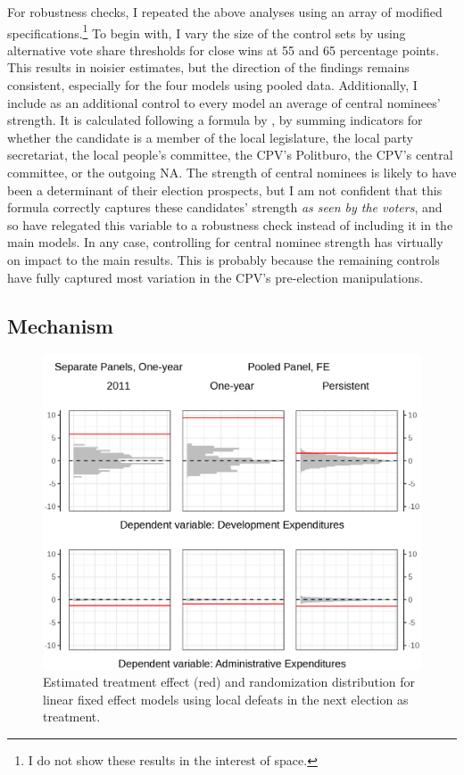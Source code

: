 \documentclass[12pt]{article}\usepackage[]{graphicx}\usepackage[]{color}
\newcommand{\1}{\mathbbm{1}}
\begin{document}
For robustness checks, I repeated the above analyses using an array of modified specifications.\footnote{I do not show these results in the interest of space.} To begin with, I vary the size of the control sets by using alternative vote share thresholds for close wins at 55 and 65 percentage points. This results in noisier estimates, but the direction of the findings remains consistent, especially for the four models using pooled data. Additionally, I include as an additional control to every model an average of central nominees' strength. It is calculated following a formula by \cite{MaleskySchuler2011}, by summing indicators for whether the candidate is a member of the local legislature, the local party secretariat, the local people's committee, the CPV's Politburo, the CPV's central committee, or the outgoing NA. The strength of central nominees is likely to have been a determinant of their election prospects, but I am not confident that this formula correctly captures these candidates' strength \textit{as seen by the voters}, and so have relegated this variable to a robustness check instead of including it in the main models. In any case, controlling for central nominee strength has virtually on impact to the main results. This is probably because the remaining controls have fully captured most variation in the CPV's pre-election manipulations.

\subsection{Mechanism}

\begin{figure}[!htbp]
	\centering
	\includegraphics[width=\textwidth]{figure/SYP_FE_MECH.png}
	\captionsetup{singlelinecheck=off}
	\caption[Estimated effects of future treatment]{Estimated treatment effect (red) and randomization distribution for linear fixed effect models using local defeats in the next election as treatment.}
	\label{fig:Mech}
\end{figure}
\end{document}
